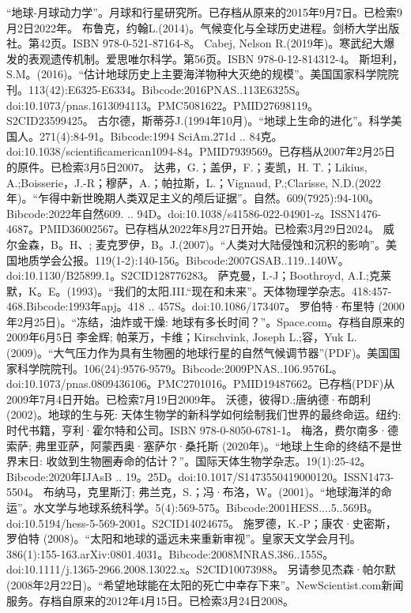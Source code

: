 \begin{enumerate}
 “地球-月球动力学”。月球和行星研究所。已存档从原来的2015年9月7日。已检索9月2日2022年。
 布鲁克，约翰L.(2014)。气候变化与全球历史进程。剑桥大学出版社。第42页。ISBN 978-0-521-87164-8。
 Cabej, Nelson R.(2019年)。寒武纪大爆发的表观遗传机制。爱思唯尔科学。第56页。ISBN 978-0-12-814312-4。
 斯坦利，S.M。(2016)。“估计地球历史上主要海洋物种大灭绝的规模”。美国国家科学院院刊。113(42):E6325-E6334。Bibcode:2016PNAS..113E6325S。doi:10.1073/pnas.1613094113。PMC5081622。PMID27698119。S2CID23599425。    
 古尔德，斯蒂芬J.(1994年10月)。“地球上生命的进化”。科学美国人。271(4):84-91。Bibcode:1994 SciAm.271d .. 84克。doi:10.1038/scientificamerican1094-84。PMID7939569。已存档从2007年2月25日的原件。已检索3月5日2007。 
 达弗，G.；盖伊，F.；麦凯，H. T.；Likius, A.;Boisserie，J.-R；穆萨，A.；帕拉斯，L.；Vignaud, P.;Clarisse, N.D.(2022年)。“乍得中新世晚期人类双足主义的颅后证据”。自然。609(7925):94-100。Bibcode:2022年自然609. .. 94D。doi:10.1038/s41586-022-04901-z。ISSN1476-4687。PMID36002567。已存档从2022年8月27日开始。已检索3月29日2024。  
 威尔金森，B。H、; 麦克罗伊，B。J.(2007)。“人类对大陆侵蚀和沉积的影响”。美国地质学会公报。119(1-2):140-156。Bibcode:2007GSAB..119..140W。doi:10.1130/B25899.1。S2CID128776283。 
 萨克曼，I.-J；Boothroyd, A.I.;克莱默，K。E。(1993)。“我们的太阳.III.“现在和未来”。天体物理学杂志。418:457-468.Bibcode:1993年apj。418 .. 457S。doi:10.1086/173407。
 罗伯特·布里特 (2000年2月25日)。“冻结，油炸或干燥: 地球有多长时间？”。Space.com。存档自原来的2009年6月5日
 李金辉; 帕莱万，卡维；Kirschvink, Joseph L.;容，Yuk L.(2009)。“大气压力作为具有生物圈的地球行星的自然气候调节器”(PDF)。美国国家科学院院刊。106(24):9576-9579。Bibcode:2009PNAS..106.9576L。doi:10.1073/pnas.0809436106。PMC2701016。PMID19487662。已存档(PDF)从2009年7月4日开始。已检索7月19日2009年。   
 沃德，彼得D.;唐纳德·布朗利(2002)。地球的生与死: 天体生物学的新科学如何绘制我们世界的最终命运。纽约: 时代书籍，亨利·霍尔特和公司。ISBN 978-0-8050-6781-1。
 梅洛，费尔南多·德索萨; 弗里亚萨，阿蒙西奥·塞萨尔·桑托斯 (2020年)。“地球上生命的终结不是世界末日: 收敛到生物圈寿命的估计？”。国际天体生物学杂志。19(1):25-42。Bibcode:2020年IJAsB .. 19。25D。doi:10.1017/S1473550419000120。ISSN1473-5504。 
 布纳马，克里斯汀; 弗兰克，S.；冯·布洛，W。(2001)。“地球海洋的命运”。水文学与地球系统科学。5(4):569-575。Bibcode:2001HESS....5..569B。doi:10.5194/hess-5-569-2001。S2CID14024675。 
 施罗德，K.-P；康农·史密斯，罗伯特 (2008)。“太阳和地球的遥远未来重新审视”。皇家天文学会月刊。386(1):155-163.arXiv:0801.4031。Bibcode:2008MNRAS.386..155S。doi:10.1111/j.1365-2966.2008.13022.x。S2CID10073988。 
另请参见杰森·帕尔默 (2008年2月22日)。“希望地球能在太阳的死亡中幸存下来”。NewScientist.com新闻服务。存档自原来的2012年4月15日。已检索3月24日2008。

\end{enumerate}

